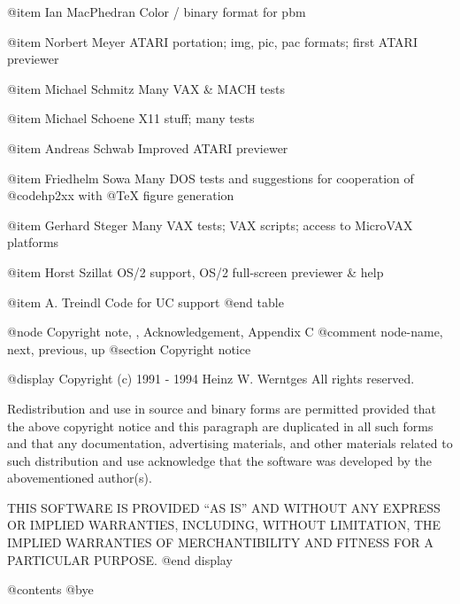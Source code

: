 @item Ian MacPhedran
Color / binary format for pbm

@item Norbert Meyer
ATARI portation; img, pic, pac formats; first ATARI previewer

@item Michael Schmitz
Many VAX & MACH tests

@item Michael Schoene
X11 stuff; many tests

@item Andreas Schwab
Improved ATARI previewer

@item Friedhelm Sowa
Many DOS tests and suggestions for cooperation of @code{hp2xx} with
@TeX{} figure generation

@item Gerhard Steger
Many VAX tests; VAX scripts; access to MicroVAX platforms

@item Horst Szillat
OS/2 support, OS/2 full-screen previewer & help

@item A. Treindl
Code for UC support
@end table



@node Copyright note, , Acknowledgement, Appendix C
@comment  node-name,  next,  previous,  up
@section Copyright notice

@display
Copyright (c) 1991 - 1994  Heinz W. Werntges
All rights reserved.

Redistribution and use in source and binary forms are permitted provided that
the above copyright notice and this paragraph are duplicated in all such forms
and that any documentation, advertising materials, and other materials related
to such distribution and use acknowledge that the software was developed
by the abovementioned author(s).

THIS SOFTWARE IS PROVIDED ``AS IS'' AND WITHOUT ANY EXPRESS
OR IMPLIED WARRANTIES, INCLUDING, WITHOUT LIMITATION,
THE IMPLIED WARRANTIES OF MERCHANTIBILITY AND FITNESS
FOR A PARTICULAR PURPOSE.
@end display

@contents
@bye


